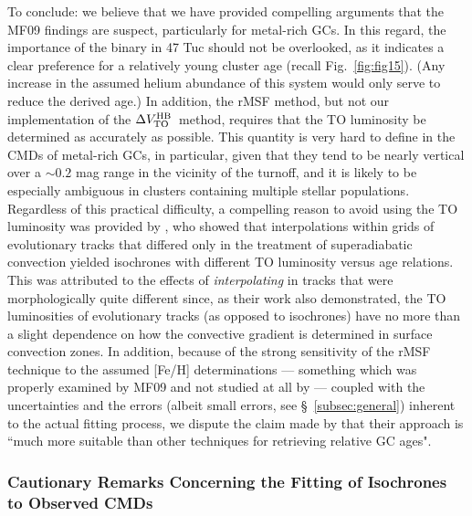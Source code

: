 \documentclass[12pt,preprint]{aastex}
\newcommand\delv{\Delta V^{\rm HB}_{\rm TO}}
\newcommand\lta{\mathrel{\hbox{\raise 0.6 ex \hbox{$<$}\kern
                   -1.8 ex\lower .5 ex\hbox{$\sim$}}}}
\begin{document}
To conclude: we believe that we have provided compelling arguments that the
MF09 findings are suspect, particularly for metal-rich GCs.  In this regard,
the importance of the binary in 47 Tuc should not be overlooked, as it indicates
a clear preference for a relatively young cluster age (recall
Fig.~\ref{fig:fig15}).  (Any increase in the assumed helium abundance of this
system would only serve to reduce the derived age.)  In addition,
the rMSF method, but not our implementation of the $\delv$\ method, requires
that the TO luminosity be determined as accurately as possible.  This quantity
is very hard to define in the CMDs of metal-rich GCs, in particular, given
that they tend to be nearly vertical over a $\sim 0.2$ mag range in the
vicinity of the turnoff, and it is likely to be especially ambiguous in clusters
containing multiple stellar populations.  Regardless of this practical
difficulty, a compelling reason to avoid using the TO luminosity was provided
by \citet{mdc95}, who showed that interpolations within grids of evolutionary
tracks that differed only in the treatment of superadiabatic convection yielded
isochrones with different TO luminosity versus age relations.  This was
attributed to the effects of {\it interpolating} in tracks that were
morphologically quite different since, as their work also demonstrated, the TO
luminosities of evolutionary tracks (as opposed to isochrones) have no more than
a slight dependence on how the convective gradient is determined in surface
convection zones.  In addition, because of the strong sensitivity of the rMSF
technique to the assumed [Fe/H] determinations --- something which was properly
examined by MF09 and not studied at all by \citet{mca10} --- coupled with the
uncertainties and the errors (albeit small errors, see \S~\ref{subsec:general})
inherent to the actual fitting process, we dispute the claim made by
\citet{mca10} that their approach is ``much more suitable than other techniques
for retrieving relative GC ages".

\subsubsection{Cautionary Remarks Concerning the Fitting of Isochrones to
Observed CMDs}
\label{subsubsec:caution}
\end{document}
